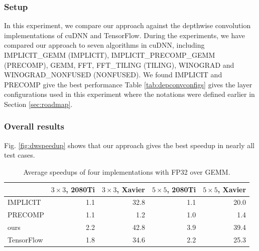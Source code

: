 \subsubsection{Setup} In this experiment, we compare our approach against the depthwise convolution implementations of cuDNN and TensorFlow.
During the experiments, we have compared our approach to seven algorithms in cuDNN, including IMPLICIT\_GEMM (IMPLICIT), IMPLICIT\_PRECOMP\_GEMM (PRECOMP), GEMM, FFT, FFT\_TILING (TILING), WINOGRAD and WINOGRAD\_NONFUSED (NONFUSED). We found IMPLICIT and PRECOMP give the best performance  Table \ref{tab:depconvconfigs} gives the layer configurations used in this experiment where the notations were defined earlier in Section \ref{sec:roadmap}.


\subsubsection{Overall results}
 Fig. \ref{fig:dwspeedup} shows that our approach gives the best speedup in nearly all test cases. 
 
\begin{table}[]
\setlength{\tabcolsep}{2.3pt}
\caption{Average speedups of four implementations with FP32 over GEMM.}
\vspace{-3mm}
\label{tab:dwspeedups}
\centering
{}
\begin{threeparttable}
\begin{tabular}{l|r|r|r|r}
\toprule
& $3 \times 3$, 2080Ti & $3 \times 3$, Xavier &$5 \times 5$, 2080Ti&$5 \times 5$, Xavier\\
\midrule
IMPLICIT & 1.1 & 32.8 & 1.1 & 20.0\\
PRECOMP & 1.1 & 1.2 & 1.0 & 1.4\\
ours & 2.2 & 42.8 & 3.9 &39.4 \\
TensorFlow & 1.8 & 34.6 & 2.2 & 25.3\\

\bottomrule
\end{tabular}
\end{threeparttable}
\end{table}

